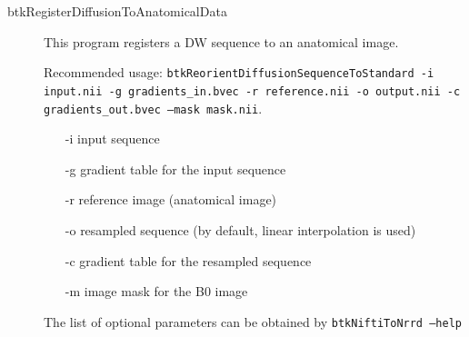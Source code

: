 \begin{description}
\item[btkRegisterDiffusionToAnatomicalData] This program registers a DW
sequence to an anatomical image. 

Recommended usage: \texttt{btkReorientDiffusionSequenceToStandard -i input.nii
-g
gradients\_in.bvec -r reference.nii -o output.nii -c gradients\_out.bvec
--mask mask.nii}.
\begin{itemize}
\item[-i] input sequence
\item[-g] gradient table for the input sequence
\item[-r] reference image (anatomical image)
\item[-o] resampled sequence (by default, linear interpolation is used)
\item[-c] gradient table for the resampled sequence
\item[-m] image mask for the B0 image
\end{itemize}

The list of optional parameters can be obtained by \texttt{btkNiftiToNrrd
--help}

\end{description}
